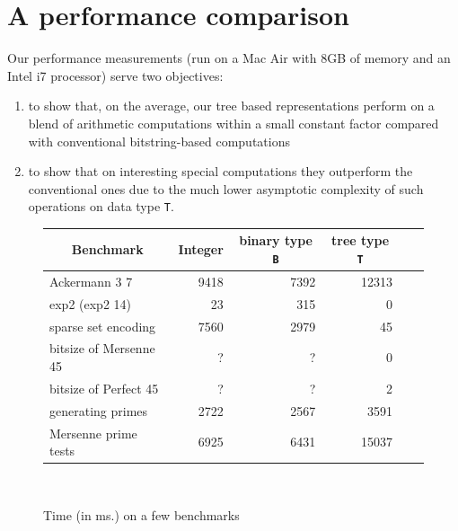 \documentclass{TOOLS/llncs}
\begin{document}
\section{A performance comparison} \label{perfcomp}



Our performance measurements (run on a Mac Air with 8GB of memory and an Intel i7 processor) serve two objectives:
\begin{enumerate}
\item to show that, on the average, our tree based representations perform on a blend of arithmetic computations within a small constant factor compared with conventional bitstring-based computations

\item to show that on interesting special computations they outperform the conventional ones due to the much lower asymptotic complexity of such operations on data type {\tt T}.
\end{enumerate}


\begin{figure} 
\begin{center}
\begin{tabular}{||l||r|r|r|r|r||}
\hline
\hline
\multicolumn{1}{||c||}{{\small Benchmark}} & 
  \multicolumn{1}{c|}{{\small Integer}} &
  \multicolumn{1}{c|}{{\small binary type {\tt B}}} &
  \multicolumn{1}{c|}{{\small tree type {\tt T}}}\\
\hline 
\hline
 {\small Ackermann 3 7}   & 9418 & 7392 & 12313   \\ \hline
 {\small exp2 (exp2 14)}   & 23 & 315 & 0   \\ \hline
 {\small sparse set encoding} & 7560 & 2979 & 45     \\ \hline
 
 {\small bitsize of Mersenne 45} & ? & ? & 0    \\ \hline
 {\small bitsize of Perfect 45}   & ? & ? & 2   \\ \hline \hline


{\small generating primes} & 2722 & 2567 & 3591    \\ \hline
 {\small Mersenne prime tests} &  6925  & 6431 & 15037   \\ \hline \hline


\hline
\hline
\end{tabular} \\
\medskip
\caption{Time (in ms.) on a few benchmarks
\label{perf}}
\end{center}
\end{figure}
\end{document}
